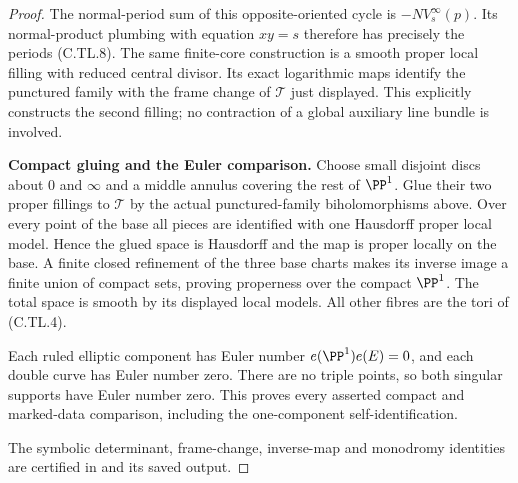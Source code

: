 \begin{proof}
The normal-period sum of this opposite-oriented cycle is
$-N V^\infty_s(p)$. Its normal-product plumbing with equation
$xy=s$ therefore has precisely the periods (C.TL.8).
The same finite-core construction is a smooth proper local
filling with reduced central divisor. Its exact logarithmic
maps identify the punctured family with the frame change of
$\mathcal T$ just displayed. This explicitly constructs the
second filling; no contraction of a global auxiliary line
bundle is involved.

\par\medskip\noindent\textbf{Compact gluing and the Euler comparison.}
Choose small disjoint discs about $0$ and $\infty$ and a middle
annulus covering the rest of $\PP^1$. Glue their two proper
fillings to $\mathcal T$ by the actual punctured-family
biholomorphisms above. Over every point of the base all pieces
are identified with one Hausdorff proper local model. Hence
the glued space is Hausdorff and the map is proper locally
on the base. A finite closed refinement of the three base
charts makes its inverse image a finite union of compact
sets, proving properness over the compact $\PP^1$.
The total space is smooth by its displayed local models.
All other fibres are the tori of (C.TL.4).

Each ruled elliptic component has Euler number
$e(\PP^1)e(E)=0$, and each double curve has Euler number zero.
There are no triple points, so both singular supports have
Euler number zero. This proves every asserted compact and
marked-data comparison, including the one-component
self-identification.

The symbolic determinant, frame-change, inverse-map and
monodromy identities are certified in
 and its saved output.
\end{proof}
